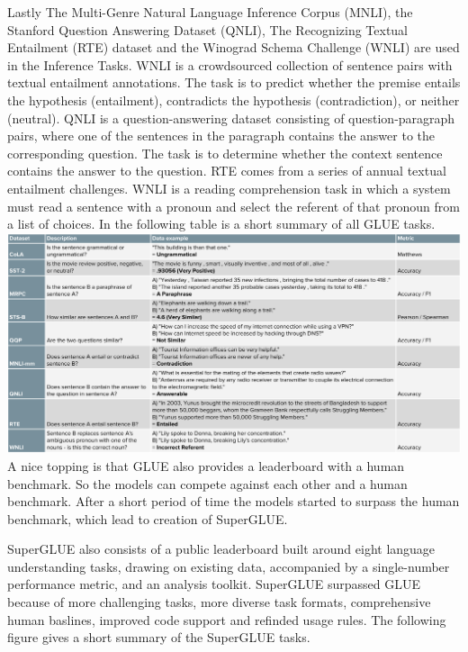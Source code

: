 \documentclass[
]{krantz}
\begin{document}
Lastly The Multi-Genre Natural Language Inference Corpus (MNLI), the Stanford Question Answering Dataset (QNLI), The Recognizing Textual Entailment (RTE) dataset and the Winograd Schema Challenge (WNLI) are used in the Inference Tasks. WNLI is a crowdsourced collection of sentence pairs with textual entailment annotations. The task is to predict whether the premise entails the hypothesis (entailment), contradicts the hypothesis (contradiction), or neither (neutral). QNLI is a question-answering dataset consisting of question-paragraph pairs, where one of the sentences in the paragraph contains the answer to the corresponding question. The task is to determine whether the context sentence contains the answer to the question. RTE comes from a series of annual textual entailment challenges. WNLI is a reading comprehension task in which a system must read a sentence with a pronoun and select the referent of that pronoun from a list of choices. In the following table is a short summary of all GLUE tasks.
\includegraphics{figures/01-chapter1/glue_table_condensed.png}
A nice topping is that GLUE also provides a leaderboard with a human benchmark. So the models can compete against each other and a human benchmark. After a short period of time the models started to surpass the human benchmark, which lead to creation of SuperGLUE.

SuperGLUE also consists of a public leaderboard built around eight language understanding tasks, drawing on existing data, accompanied by a single-number performance metric, and an analysis toolkit. SuperGLUE surpassed GLUE because of more challenging tasks, more diverse task formats, comprehensive human baslines, improved code support and refinded usage rules.
The following figure gives a short summary of the SuperGLUE tasks.
\end{document}
